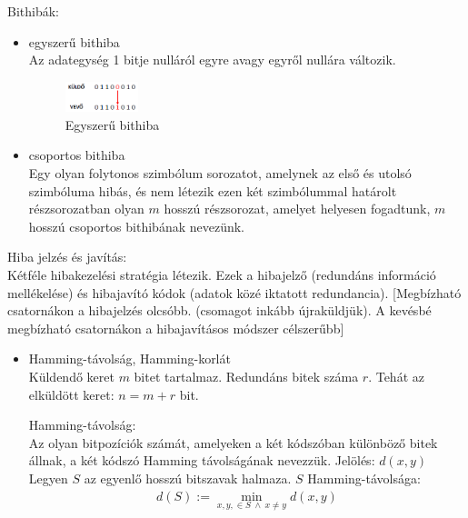\documentclass[margin=0px]{article}
\begin{document}
\begin{description}
				Bithibák:
				\begin{itemize}
					\item egyszerű bithiba \\
						Az adategység 1 bitje nulláról egyre avagy egyről nullára változik.
						\begin{figure}[H]
							\centering
							\includegraphics[width=0.2\textwidth]{img/egyszeru_bithiba.png}
							\caption{Egyszerű bithiba}	
						\end{figure}
					\item csoportos bithiba \\
						Egy olyan folytonos szimbólum sorozatot, amelynek az első és utolsó szimbóluma hibás, és nem létezik ezen két szimbólummal határolt részsorozatban olyan $m$ hosszú részsorozat, amelyet helyesen fogadtunk, $m$ hosszú csoportos bithibának nevezünk.
				\end{itemize}
				
				Hiba jelzés és javítás:\\
				Kétféle hibakezelési stratégia létezik. Ezek a hibajelző (redundáns információ mellékelése) és hibajavító kódok (adatok közé iktatott redundancia).
				[Megbízható csatornákon a hibajelzés olcsóbb. (csomagot inkább újraküldjük). A kevésbé megbízható csatornákon a hibajavításos módszer célszerűbb]
				\begin{itemize}
					\item Hamming-távolság, Hamming-korlát \\
						Küldendő keret $m$ bitet tartalmaz. Redundáns bitek száma $r$. Tehát az elküldött keret: $n = m+r$ bit.
						
						Hamming-távolság: \\
						Az olyan bitpozíciók számát, amelyeken a két kódszóban különböző bitek állnak, a két kódszó Hamming távolságának nevezzük. Jelölés: $d(x,y)$\\
						Legyen $S$ az egyenlő hosszú bitszavak halmaza. $S$ Hamming-távolsága:
						\begin{align*}
						d(S) := \min_{x,y, \in S \ \land \ x \neq y} d(x,y)
						\end{align*}
						

\end{itemize}
\end{description}
\end{document}
